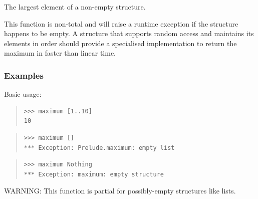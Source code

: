 \begin{haddockdesc}
\item[\begin{tabular}{@{}l}
maximum :: (Foldable t, Ord a) => t a -> a
\end{tabular}]
{\haddockbegindoc
The largest element of a non-empty structure.\par
This function is non-total and will raise a runtime exception if the
 structure happens to be empty.  A structure that supports random access
 and maintains its elements in order should provide a specialised
 implementation to return the maximum in faster than linear time.\par
\subsubsection*{\textbf{Examples}}
Basic usage:\par
\begin{quote}
{\haddockverb\begin{verbatim}
>>> maximum [1..10]
10

\end{verbatim}}
\end{quote}
\begin{quote}
{\haddockverb\begin{verbatim}
>>> maximum []
*** Exception: Prelude.maximum: empty list

\end{verbatim}}
\end{quote}
\begin{quote}
{\haddockverb\begin{verbatim}
>>> maximum Nothing
*** Exception: maximum: empty structure

\end{verbatim}}
\end{quote}
WARNING: This function is partial for possibly-empty structures like lists.\par}
\end{haddockdesc}
